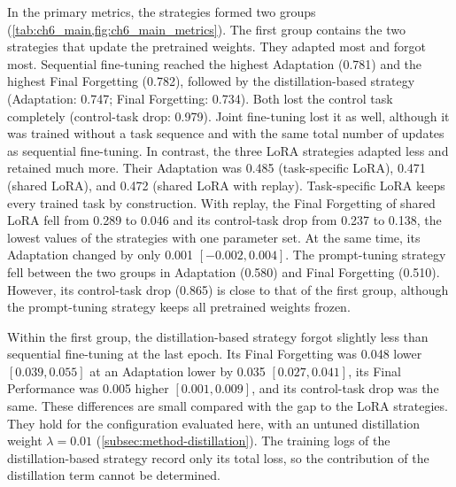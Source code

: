 In the primary metrics, the strategies formed two groups (\cref{tab:ch6_main,fig:ch6_main_metrics}).
The first group contains the two strategies that update the pretrained weights.
They adapted most and forgot most.
Sequential fine-tuning reached the highest Adaptation (0.781) and the highest Final Forgetting (0.782), followed by the distillation-based strategy (Adaptation: 0.747; Final Forgetting: 0.734).
Both lost the control task completely (control-task drop: 0.979).
Joint fine-tuning lost it as well, although it was trained without a task sequence and with the same total number of updates as sequential fine-tuning.
In contrast, the three LoRA strategies adapted less and retained much more.
Their Adaptation was 0.485 (task-specific LoRA), 0.471 (shared LoRA), and 0.472 (shared LoRA with replay).
Task-specific LoRA keeps every trained task by construction.
With replay, the Final Forgetting of shared LoRA fell from 0.289 to 0.046 and its control-task drop from 0.237 to 0.138, the lowest values of the strategies with one parameter set.
At the same time, its Adaptation changed by only 0.001 $[-0.002, 0.004]$.
The prompt-tuning strategy fell between the two groups in Adaptation (0.580) and Final Forgetting (0.510).
However, its control-task drop (0.865) is close to that of the first group, although the prompt-tuning strategy keeps all pretrained weights frozen.

Within the first group, the distillation-based strategy forgot slightly less than sequential fine-tuning at the last epoch.
Its Final Forgetting was 0.048 lower $[0.039, 0.055]$ at an Adaptation lower by 0.035 $[0.027, 0.041]$, its Final Performance was 0.005 higher $[0.001, 0.009]$, and its control-task drop was the same.
These differences are small compared with the gap to the LoRA strategies.
They hold for the configuration evaluated here, with an untuned distillation weight $\lambda = 0.01$ (\cref{subsec:method-distillation}).
The training logs of the distillation-based strategy record only its total loss, so the contribution of the distillation term cannot be determined.

